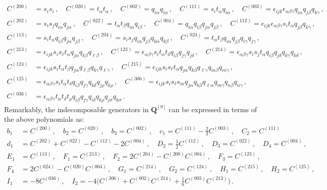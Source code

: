 \documentclass[10pt]{amsart}
\theoremstyle{definition}
\theoremstyle{corollary}
\theoremstyle{remark}
\theoremstyle{conclusion}
\begin{document}
\begin{equation}
\begin{split}
C^{(2 0 0)}&=s_i s_i \, , \quad C^{(020)}=t_\alpha t_\alpha \, , \quad C^{(002)}=q_{i \alpha}q_{i \alpha} \, , \quad C^{(111)}=s_i t_\alpha q_{i \alpha} \, , \quad C^{(003)}=\epsilon_{ijk}\epsilon_{\alpha \beta \gamma}q_{i\alpha}q_{j \beta}q_{k \gamma} \, ,\\
C^{(202)}&=s_i s_j q_{i \alpha}q_{j \alpha} \, , \quad C^{(022)}=t_\alpha t_{\beta}q_{i\alpha}q_{i \beta} \, , \quad C^{(004)}=q_{i \alpha}q_{i \beta}q_{j \alpha}q_{j\beta} \, , \quad C^{(112)}=\epsilon_{ijk}\epsilon_{\alpha \beta \gamma}s_i t_\alpha q_{j \beta} q_{k \gamma} \, ,\\
C^{(113)}&=s_i t_\alpha q_{i \beta}q_{j \alpha}q_{j \beta} \, , \quad C^{(204)}=s_is_jq_{i \alpha}q_{j \beta}q_{k \alpha}q_{k \beta} \, , \quad C^{(024)}=t_\alpha t_\beta q_{i \alpha}q_{j \beta} q_{i \gamma}q_{j \gamma} \, ,\\
 C^{(213)}&=\epsilon_{ijk}s_i s_\ell t_{\alpha}q_{j \alpha}q_{k \beta}q_{\ell \beta} \, ,\quad 
C^{(123)}=\epsilon_{\alpha \beta \gamma} s_i t_\alpha t_\delta q_{i\beta}q_{j \gamma}q_{j \delta} \, , \quad C^{(214)}=\epsilon_{\alpha \beta \gamma}s_i s_j t_{\alpha}q_{i \beta}q_{j \delta}q_{k \gamma}q_{k \delta}\, , \\
 C^{(124)}&=\epsilon_{ijk}s_i t_\alpha t_\beta q_{j \alpha}q_{\ell \beta}q_{k \gamma}q_{\ell \gamma} \, , \quad C^{(215)}=\epsilon_{ijk}s_i s_\ell t_{\alpha}q_{j \alpha}q_{k \beta}q_{\ell \gamma}q_{m \beta} q_{m \gamma} \, , \\
 C^{(125)}&=\epsilon_{\alpha \beta \gamma}s_i  t_{\alpha}t_{\delta} q_{i \beta}q_{j \gamma}q_{k \delta}q_{j \rho} q_{k \rho}\,  , \quad C^{(306)}=\epsilon_{ijk}s_i s_\ell s_m q_{j \alpha}q_{k \beta}q_{\ell \alpha}q_{m \gamma}q_{n \beta}q_{n \gamma} \, , \\
 C^{(036)}&=\epsilon_{\alpha \beta \gamma}t_\alpha t_\delta t_\rho q_{i \beta}q_{j \gamma}q_{i \delta}q_{k \rho}q_{j \sigma}q_{k \sigma} \, .
\end{split}
\label{polquesne}
\end{equation}
 Remarkably, the indecomposable generators in $\boldsymbol{Q}^{[9]}$ can be expressed in terms of the above polynomials as:
\begin{equation}
\begin{split}
b_1&=C^{(200)}  \, , \quad b_2=C^{(020)} \, , \quad b_3=C^{(002)} \, , \quad c_1=C^{(111)}-\frac{2}{3}C^{(003)} \, , \quad C_2=C^{(111)}\\
d_1&=C^{(202)}+C^{(022)}-C^{(112)}-2 C^{(004)} \, ,\quad D_2=\frac{1}{2}C^{(112)} \, , \quad D_3=C^{(022)} \, ,\quad D_4=C^{(004)} \, , \\
 E_1&=C^{(113)} \, ,\quad  F_1=C^{(213)} \, , \quad F_2=2 C^{(204)}-C^{(200)}C^{(004)} \, , \quad F_3=C^{(123)} \, , \\
 F_4&=2 C^{(024)}-C^{(020)}C^{(004)} \, , \quad G_1=C^{(214)} \, , \quad  G_2=C^{(124)} \, , \quad H_1= C^{(215)} \, , \quad H_2=C^{(125)} \, , \\
 I_1&=-8C^{(036)} \, , \quad I_2=-4\bigl(C^{(306)}+C^{(002)}C^{(214)}+\frac{1}{6}C^{(003)} C^{(213)}\bigl) \, .
\end{split} 
\label{poldanilo}
\end{equation}
\end{document}
